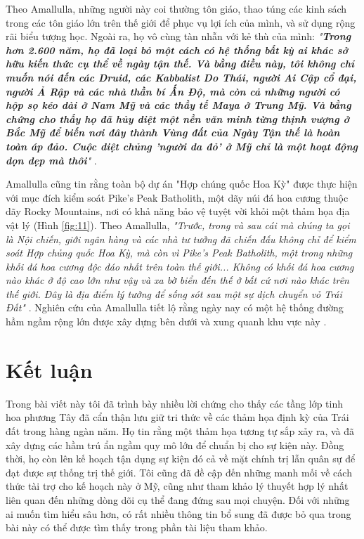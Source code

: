 Theo Amallulla, những người này coi thường tôn giáo, thao túng các kinh sách trong các tôn giáo lớn trên thế giới để phục vụ lợi ích của mình, và sử dụng rộng rãi biểu tượng học. Ngoài ra, họ vô cùng tàn nhẫn với kẻ thù của mình: \textit{"\textbf{Trong hơn 2.600 năm, họ đã loại bỏ một cách có hệ thống bất kỳ ai khác sở hữu kiến thức cụ thể về ngày tận thế. Và bằng điều này, tôi không chỉ muốn nói đến các Druid, các Kabbalist Do Thái, người Ai Cập cổ đại, người Ả Rập và các nhà thần bí Ấn Độ, mà còn cả những người có hộp sọ kéo dài ở Nam Mỹ và các thầy tế Maya ở Trung Mỹ. Và bằng chứng cho thấy họ đã hủy diệt một nền văn minh từng thịnh vượng ở Bắc Mỹ để biến nơi đây thành Vùng đất của Ngày Tận thế là hoàn toàn áp đảo. Cuộc diệt chủng 'người da đỏ' ở Mỹ chỉ là một hoạt động dọn dẹp mà thôi}"} \cite{33,34}.

Amallulla cũng tin rằng toàn bộ dự án "Hợp chúng quốc Hoa Kỳ" được thực hiện với mục đích kiểm soát Pike's Peak Batholith, một dãy núi đá hoa cương thuộc dãy Rocky Mountains, nơi có khả năng bảo vệ tuyệt vời khỏi một thảm họa địa vật lý (Hình \ref{fig:11}). Theo Amallulla, \textit{"Trước, trong và sau cái mà chúng ta gọi là Nội chiến, giới ngân hàng và các nhà tư tưởng đã chiến đấu không chỉ để kiểm soát Hợp chủng quốc Hoa Kỳ, mà còn vì Pike's Peak Batholith, một trong những khối đá hoa cương độc đáo nhất trên toàn thế giới... Không có khối đá hoa cương nào khác ở độ cao lớn như vậy và xa bờ biển đến thế ở bất cứ nơi nào khác trên thế giới. Đây là địa điểm lý tưởng để sống sót sau một sự dịch chuyển vỏ Trái Đất"} \cite{33,34}. Nghiên cứu của Amallulla tiết lộ rằng ngày nay có một hệ thống đường hầm ngầm rộng lớn được xây dựng bên dưới và xung quanh khu vực này \cite{36}.

\section{Kết luận}

Trong bài viết này tôi đã trình bày nhiều lời chứng cho thấy các tầng lớp tinh hoa phương Tây đã cẩn thận lưu giữ tri thức về các thảm họa định kỳ của Trái đất trong hàng ngàn năm. Họ tin rằng một thảm họa tương tự sắp xảy ra, và đã xây dựng các hầm trú ẩn ngầm quy mô lớn để chuẩn bị cho sự kiện này. Đồng thời, họ còn lên kế hoạch tận dụng sự kiện đó cả về mặt chính trị lẫn quân sự để đạt được sự thống trị thế giới. Tôi cũng đã đề cập đến những manh mối về cách thức tài trợ cho kế hoạch này ở Mỹ, cũng như tham khảo lý thuyết hợp lý nhất liên quan đến những dòng dõi cụ thể đang đứng sau mọi chuyện. Đối với những ai muốn tìm hiểu sâu hơn, có rất nhiều thông tin bổ sung đã được bỏ qua trong bài này có thể được tìm thấy trong phần tài liệu tham khảo.


